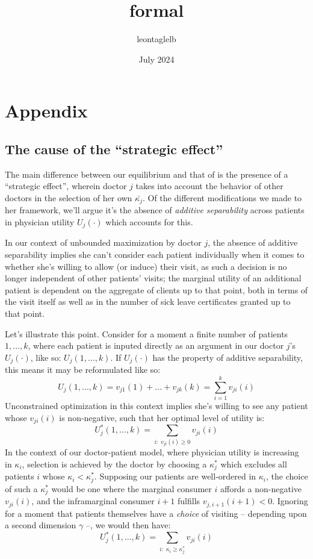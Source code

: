 \documentclass{article}
\title{formal}
\author{leontaglelb }
\date{July 2024}
\begin{document}
\section{Appendix}

\subsection{The cause of the ``strategic effect''}

The main difference between our equilibrium and that of \cite{schnell2017physician} is the presence of a ``strategic effect'', wherein doctor $j$ takes into account the behavior of other doctors in the selection of her own $\bar{\kappa_j}$. Of the different modifications we made to her framework, we'll argue it's the absence of \textit{additive separability} across patients in physician utility $U_j(\cdot)$ which accounts for this.

In our context of unbounded maximization by doctor $j$, the absence of additive separability implies she can't consider each patient individually when it comes to whether she's willing to allow (or induce) their visit, as such a decision is no longer independent of other patients' visits; the marginal utility of an additional patient is dependent on the aggregate of clients up to that point, both in terms of the visit itself as well as in the number of sick leave certificates granted up to that point.

Let's illustrate this point. Consider for a moment a finite number of patients $1, ... , k$, where each patient is inputed directly as an argument in our doctor $j$’s $U_j(\cdot)$, like so: $U_j(1, ..., k)$. If $U_j(\cdot)$ has the property of additive separability, this means it may be reformulated like so:
\[
U_j(1, ...,k) = v_{j1}(1) + ... + v_{jk}(k) = \sum_{i = 1}^{k} v_{ji}(i)
\]
Unconstrained optimization in this context implies she’s willing to see any patient whose $v_{ji}(i)$ is non-negative, such that her optimal level of utility is:
\[
U_j^*(1, ...,k) =  \sum_{i : \; v_{ji}(i) \geq 0} v_{ji}(i)
\]
In the context of our doctor-patient model, where physician utility is increasing in $\kappa_i$, selection is achieved by the doctor by choosing a $\kappa_j^*$ which excludes all patients $i$ whose $\kappa_i < \kappa_j^*$. Supposing our patients are well-ordered in $\kappa_i$, the choice of such a $\kappa_j^*$ would be one where the marginal consumer $i$ affords a non-negative $v_{ji}(i)$, and the inframarginal consumer $i + 1$ fulfills $v_{j,i+1}(i+1) < 0$. Ignoring for a moment that patients themselves have a \textit{choice} of visiting -- depending upon a second dimension $\gamma$ --, we would then have:
\[
U_j^*(1, ...,k) =  \sum_{i : \; \kappa_i \geq \kappa_j^*} v_{ji}(i)
\]
\end{document}
